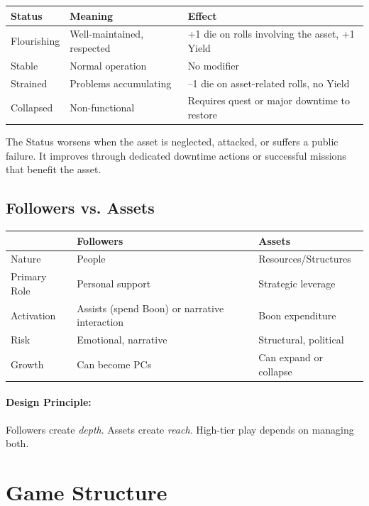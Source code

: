 \begin{center}
\small
\begin{tabular}{lll}
\toprule
\textbf{Status} & \textbf{Meaning} & \textbf{Effect} \\
\midrule
Flourishing & Well-maintained, respected & +1 die on rolls involving the asset, +1 Yield \\
Stable & Normal operation & No modifier \\
Strained & Problems accumulating & --1 die on asset-related rolls, no Yield \\
Collapsed & Non-functional & Requires quest or major downtime to restore \\
\bottomrule
\end{tabular}
\end{center}

The Status worsens when the asset is neglected, attacked, or suffers a public failure. It improves through dedicated downtime actions or successful missions that benefit the asset.

\subsection{Followers vs. Assets}
\begin{center}
\begin{tabular}{p{3cm}p{5cm}p{5cm}}
\toprule
 & \textbf{Followers} & \textbf{Assets} \\
\midrule
Nature & People & Resources/Structures \\
Primary Role & Personal support & Strategic leverage \\
Activation & Assists (spend Boon) or narrative interaction & Boon expenditure \\
Risk & Emotional, narrative & Structural, political \\
Growth & Can become PCs & Can expand or collapse \\
\bottomrule
\end{tabular}
\end{center}

\paragraph{Design Principle:} Followers create \textit{depth}. Assets create \textit{reach}. High-tier play depends on managing both.

\section{Game Structure}
\label{sec:game-structure}

